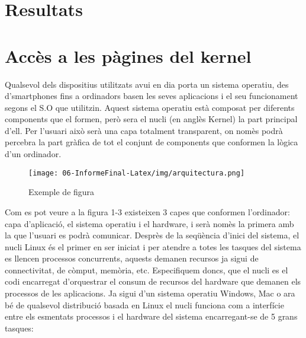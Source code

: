 ﻿\documentclass[10pt,a4paper,twocolumn,twoside]{article}
\begin{document}
\section{Resultats}



\section{Accès a les pàgines del kernel}
Qualsevol dels dispositius utilitzats avui en dia porta un sistema operatiu, des d’smartphones fins a ordinadors basen les seves aplicacions i el seu funcionament segons el S.O que utilitzin. Aquest sistema operatiu està composat per diferents components que el formen, però sera el nucli (en anglès Kernel) la part principal d’ell. Per l’usuari això serà una capa totalment transparent, on nomès podrà percebra la part gràfica de tot el conjunt de components que conformen la lògica d’un ordinador.

\begin{figure}[!h]
\centering
	\texttt{[image: 06-InformeFinal-Latex/img/arquitectura.png]}
	\caption{Exemple de figura}
	\label{fig-exemple}
\end{figure}

Com es pot veure a la figura 1-3 existeixen 3 capes que conformen l’ordinador: capa d’aplicació, el sistema operatiu i el hardware, i serà nomès la primera amb la que l’usuari es podrà comunicar. Desprès de la seqüència d’inici del sistema, el nucli Linux és el primer en ser iniciat i per atendre a totes les tasques del sistema es llencen processos concurrents, aquests demanen recursos ja sigui de connectivitat, de còmput, memòria, etc. Especifiquem doncs, que el nucli es el codi encarregat d’orquestrar el consum de recursos del hardware que demanen els processos de les aplicacions.
Ja sigui d’un sistema operatiu Windows, Mac o ara bé de qualsevol distribució basada en Linux el nucli funciona com a interfície entre els esmentats processos i el hardware del sistema encarregant-se de 5 grans tasques:
\end{document}
